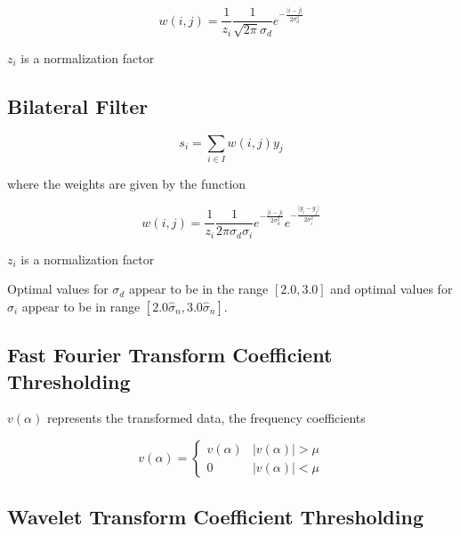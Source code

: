 \documentclass[11pt]{article}
\theoremstyle{definition}
\begin{document}
\begin{displaymath}
w\left(i, j\right) = \frac{1}{z_i} \frac{1}{\sqrt{2 \pi} \sigma_d} e^{-\frac{\lvert i - j \rvert}{2 \sigma_d^2}}
\end{displaymath}

\noindent
$z_i$ is a normalization factor


\subsection{Bilateral Filter}

\begin{displaymath}
s_i = \sum _{i \in I} w \left(i, j \right) y_j
\end{displaymath}

\noindent
where the weights are given by the function

\begin{displaymath}
w\left(i, j\right) = \frac{1}{z_i} \frac{1}{2 \pi \sigma_d \sigma_i} e^{-\frac{\lvert i - j \rvert}{2 \sigma_d^2}}e^{-\frac{\lvert y_i - y_j \rvert}{2 \sigma_i^2}}
\end{displaymath}

\noindent
$z_i$ is a normalization factor

\noindent
Optimal values for $\sigma_d$ appear to be in the range $\left[ 2.0, 3.0 \right]$ and optimal values for $\sigma_i$ appear to be in range $\left[ 2.0 \hat{\sigma}_n, 3.0 \hat{\sigma}_n \right]$.


\subsection{Fast Fourier Transform Coefficient Thresholding}

$v\left(\alpha\right)$ represents the transformed data, the frequency coefficients

\begin{displaymath}
v\left(\alpha\right) = 
\begin{cases}
v\left(\alpha\right) & \lvert v\left(\alpha\right)\rvert > \mu \\
0 & \lvert v\left(\alpha\right)\rvert < \mu
\end{cases}
\end{displaymath}


\subsection{Wavelet Transform Coefficient Thresholding}
\end{document}
